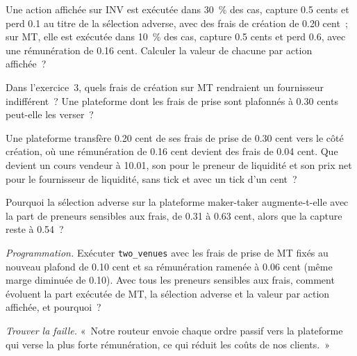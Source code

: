 \begin{exercise}[$\star$]\label{exo:mx:fees-rebates-and-venue-economics:3}
Une action affichée sur INV est exécutée dans 30~\% des cas, capture 0.5 cents et perd 0.1 au titre de la sélection adverse, avec des frais de création de 0.20 cent~; sur MT, elle est exécutée dans 10~\% des
cas, capture 0.5 cents et perd 0.6, avec une rémunération de 0.16 cent. Calculer la valeur de chacune par action affichée~?
\end{exercise}

\begin{exercise}[$\star\star$]\label{exo:mx:fees-rebates-and-venue-economics:4}
Dans l'exercice~3, quels frais de création sur MT rendraient un fournisseur indifférent~? Une plateforme dont les frais de prise sont plafonnés à 0.30 cents peut-elle les verser~?
\end{exercise}

\begin{exercise}[$\star\star$]\label{exo:mx:fees-rebates-and-venue-economics:5}
Une plateforme transfère 0.20 cent de ses frais de prise de 0.30 cent vers le côté création, où une rémunération de 0.16 cent devient des frais de 0.04 cent. Que devient un cours vendeur à 10.01,
son  pour le preneur de liquidité et son prix net pour le fournisseur de liquidité, sans tick et avec un tick d'un cent~?
\end{exercise}

\begin{exercise}[$\star\star$]\label{exo:mx:fees-rebates-and-venue-economics:6}
Pourquoi la sélection adverse sur la plateforme maker-taker augmente-t-elle avec la part de preneurs sensibles aux frais, de 0.31 à 0.63 cent, alors que la capture reste à 0.54~?
\end{exercise}

\begin{exercise}[$\star\star\star$]\label{exo:mx:fees-rebates-and-venue-economics:7}
\emph{Programmation.} Exécuter \texttt{two\_venues} avec les frais de prise de MT fixés au nouveau plafond de 0.10 cent et sa rémunération ramenée à 0.06 cent (même marge diminuée de 0.10). Avec tous
les preneurs sensibles aux frais, comment évoluent la part exécutée de MT, la sélection adverse et la valeur par action affichée, et pourquoi~?
\end{exercise}

\begin{exercise}[$\star\star\star$]\label{exo:mx:fees-rebates-and-venue-economics:8}
\emph{Trouver la faille.} «~Notre routeur envoie chaque ordre passif vers la plateforme qui verse la plus forte rémunération, ce qui réduit les coûts de nos clients.~»
\end{exercise}

